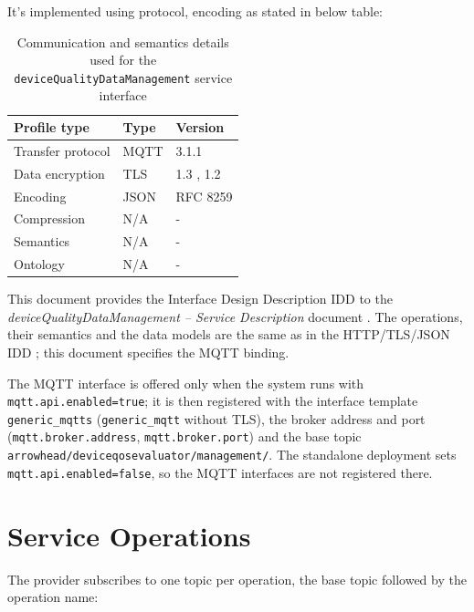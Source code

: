 \documentclass[a4paper]{arrowhead}
\begin{document}
It's implemented using protocol, encoding as stated in below table:
\begin{table}[ht!]
  \centering
  \begin{tabular}{|l|l|l|}
    \hline
    \rowcolor{gray!33} Profile type & Type & Version \\ \hline
    Transfer protocol & MQTT & 3.1.1 \cite{mqtt311} \\ \hline
    Data encryption & TLS & 1.3 \cite{rfc8446}, 1.2 \cite{rfc5246} \\ \hline
    Encoding & JSON & RFC 8259 \cite{rfc8259} \\ \hline
    Compression & N/A & - \\ \hline
    Semantics & N/A & - \\ \hline
    Ontology & N/A & - \\ \hline
  \end{tabular}
  \caption{Communication and semantics details used for the \texttt{device\allowbreak{}Quality\allowbreak{}Data\allowbreak{}Management} service interface}
  \label{tab:comunication_semantics_profile}
\end{table}

This document provides the Interface Design Description IDD to the \textit{deviceQualityDataManagement -- Service Description} document \cite{dqe-deviceQualityDataManagement-sd}.
The operations, their semantics and the data models are the same as in the HTTP/TLS/JSON IDD \cite{dqe-deviceQualityDataManagement-http-idd}; this document specifies the MQTT binding.

The MQTT interface is offered only when the system runs with \texttt{mqtt.api.enabled=true}; it is then registered with the interface template \texttt{generic\_\allowbreak{}mqtts} (\texttt{generic\_\allowbreak{}mqtt} without TLS), the broker address and port (\texttt{mqtt.\allowbreak{}broker.\allowbreak{}address}, \texttt{mqtt.\allowbreak{}broker.\allowbreak{}port}) and the base topic \texttt{arrowhead/\allowbreak{}deviceqosevaluator/\allowbreak{}management/\allowbreak{}}. The standalone deployment sets \texttt{mqtt.\allowbreak{}api.\allowbreak{}enabled=\allowbreak{}false}, so the MQTT interfaces are not registered there.

\newpage

\section{Service Operations}
\label{sec:operations}

The provider subscribes to one topic per operation, the base topic followed by the operation name:
\end{document}
